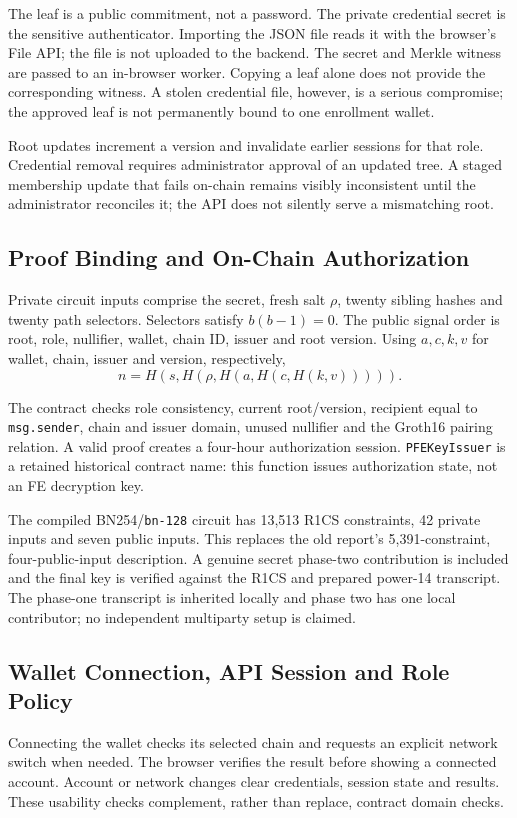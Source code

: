 \documentclass[10pt,twocolumn,a4paper]{article}
\newcommand{\code}[1]{\texttt{#1}}
\begin{document}
The leaf is a public commitment, not a password. The private credential secret is
the sensitive authenticator. Importing the JSON file reads it with the browser's
File API; the file is not uploaded to the backend. The secret and Merkle witness
are passed to an in-browser worker. Copying a leaf alone does not provide the
corresponding witness. A stolen credential file, however, is a serious compromise;
the approved leaf is not permanently bound to one enrollment wallet.

Root updates increment a version and invalidate earlier sessions for that role.
Credential removal requires administrator approval of an updated tree. A staged
membership update that fails on-chain remains visibly inconsistent until the
administrator reconciles it; the API does not silently serve a mismatching root.

\subsection{Proof Binding and On-Chain Authorization}
Private circuit inputs comprise the secret, fresh salt $\rho$, twenty sibling
hashes and twenty path selectors. Selectors satisfy $b(b-1)=0$. The public signal
order is root, role, nullifier, wallet, chain ID, issuer and root version. Using
$a,c,k,v$ for wallet, chain, issuer and version, respectively,
\begin{equation}
 n=H\!\left(s,H\!\left(\rho,H\!\left(a,H\!\left(c,H(k,v)\right)\right)\right)\right).
 \label{eq:nullifier}
\end{equation}

The contract checks role consistency, current root/version, recipient equal to
\code{msg.sender}, chain and issuer domain, unused nullifier and the Groth16
pairing relation. A valid proof creates a four-hour authorization session.
\code{PFEKeyIssuer} is a retained historical contract name: this function issues
authorization state, not an FE decryption key.

The compiled BN254/\code{bn-128} circuit has 13,513 R1CS constraints, 42 private
inputs and seven public inputs. This replaces the old report's 5,391-constraint,
four-public-input description. A genuine secret phase-two contribution is included
and the final key is verified against the R1CS and prepared power-14 transcript.
The phase-one transcript is inherited locally and phase two has one local
contributor; no independent multiparty setup is claimed.

\subsection{Wallet Connection, API Session and Role Policy}
Connecting the wallet checks its selected chain and requests an explicit network
switch when needed. The browser verifies the result before showing a connected
account. Account or network changes clear credentials, session state and results.
These usability checks complement, rather than replace, contract domain checks.
\end{document}
